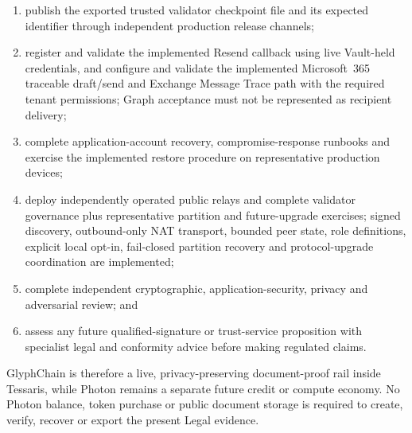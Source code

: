\begin{enumerate}
  \item publish the exported trusted validator checkpoint file and its expected
        identifier through independent production release channels;
  \item register and validate the implemented Resend callback using live
        Vault-held credentials, and configure and validate the implemented
        Microsoft~365 traceable draft/send and Exchange Message Trace path with
        the required tenant permissions; Graph acceptance must not be
        represented as recipient delivery;
  \item complete application-account recovery, compromise-response runbooks and
        exercise the implemented restore procedure on representative production
        devices;
  \item deploy independently operated public relays and complete validator
        governance plus representative partition and future-upgrade exercises;
        signed discovery, outbound-only NAT transport, bounded peer state, role
        definitions, explicit local opt-in, fail-closed partition recovery and
        protocol-upgrade coordination are implemented;
  \item complete independent cryptographic, application-security, privacy and
        adversarial review; and
  \item assess any future qualified-signature or trust-service proposition with
        specialist legal and conformity advice before making regulated claims.
\end{enumerate}

GlyphChain is therefore a live, privacy-preserving document-proof rail inside
Tessaris, while Photon remains a separate future credit or compute economy.  No
Photon balance, token purchase or public document storage is required to create,
verify, recover or export the present Legal evidence.
